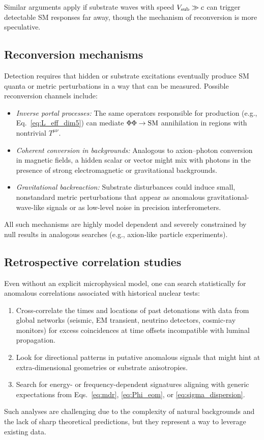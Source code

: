 \documentclass[aps,prd,twocolumn,nofootinbib,superscriptaddress]{revtex4-2}
\begin{document}
Similar arguments apply if substrate waves with speed $V_{\rm sub} \gg c$ can trigger detectable SM responses far away, though the mechanism of reconversion is more speculative.

\subsection{Reconversion mechanisms}

Detection requires that hidden or substrate excitations eventually produce SM quanta or metric perturbations in a way that can be measured. Possible reconversion channels include:
\begin{itemize}
    \item \textit{Inverse portal processes:} The same operators responsible for production (e.g., Eq.~\eqref{eq:L_eff_dim5}) can mediate $\Phi \Phi \to {\rm SM}$ annihilation in regions with nontrivial $T^{\mu\nu}$.
    \item \textit{Coherent conversion in backgrounds:} Analogous to axion--photon conversion in magnetic fields, a hidden scalar or vector might mix with photons in the presence of strong electromagnetic or gravitational backgrounds.
    \item \textit{Gravitational backreaction:} Substrate disturbances could induce small, nonstandard metric perturbations that appear as anomalous gravitational-wave-like signals or as low-level noise in precision interferometers.
\end{itemize}
All such mechanisms are highly model dependent and severely constrained by null results in analogous searches (e.g., axion-like particle experiments).

\subsection{Retrospective correlation studies}

Even without an explicit microphysical model, one can search statistically for anomalous correlations associated with historical nuclear tests:
\begin{enumerate}
    \item Cross-correlate the times and locations of past detonations with data from global networks (seismic, EM transient, neutrino detectors, cosmic-ray monitors) for excess coincidences at time offsets incompatible with luminal propagation.
    \item Look for directional patterns in putative anomalous signals that might hint at extra-dimensional geometries or substrate anisotropies.
    \item Search for energy- or frequency-dependent signatures aligning with generic expectations from Eqs.~\eqref{eq:mdr}, \eqref{eq:Phi_eom}, or \eqref{eq:sigma_dispersion}.
\end{enumerate}
Such analyses are challenging due to the complexity of natural backgrounds and the lack of sharp theoretical predictions, but they represent a way to leverage existing data.
\end{document}
